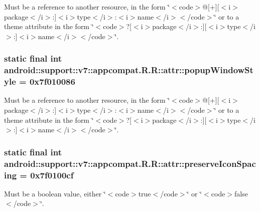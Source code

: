 Must be a reference to another resource, in the form \char`\"{}$<$code$>$@\mbox{[}+\mbox{]}\mbox{[}$<$i$>$package$<$/i$>$:\mbox{]}$<$i$>$type$<$/i$>$:$<$i$>$name$<$/i$>$$<$/code$>$\char`\"{} or to a theme attribute in the form \char`\"{}$<$code$>$?\mbox{[}$<$i$>$package$<$/i$>$:\mbox{]}\mbox{[}$<$i$>$type$<$/i$>$:\mbox{]}$<$i$>$name$<$/i$>$$<$/code$>$\char`\"{}. \hypertarget{classandroid_1_1support_1_1v7_1_1appcompat_1_1_r_1_1attr_9dcd0689639368e5d7b5f2c5ddb26921}{
\subsubsection[{popupWindowStyle}]{\setlength{\rightskip}{0pt plus 5cm}static final int android::support::v7::appcompat.R.R::attr::popupWindowStyle = 0x7f010086}}
\label{classandroid_1_1support_1_1v7_1_1appcompat_1_1_r_1_1attr_9dcd0689639368e5d7b5f2c5ddb26921}


Must be a reference to another resource, in the form \char`\"{}$<$code$>$@\mbox{[}+\mbox{]}\mbox{[}$<$i$>$package$<$/i$>$:\mbox{]}$<$i$>$type$<$/i$>$:$<$i$>$name$<$/i$>$$<$/code$>$\char`\"{} or to a theme attribute in the form \char`\"{}$<$code$>$?\mbox{[}$<$i$>$package$<$/i$>$:\mbox{]}\mbox{[}$<$i$>$type$<$/i$>$:\mbox{]}$<$i$>$name$<$/i$>$$<$/code$>$\char`\"{}. \hypertarget{classandroid_1_1support_1_1v7_1_1appcompat_1_1_r_1_1attr_05c6b925634e11d4ba272d73a5dedb05}{
\subsubsection[{preserveIconSpacing}]{\setlength{\rightskip}{0pt plus 5cm}static final int android::support::v7::appcompat.R.R::attr::preserveIconSpacing = 0x7f0100cf}}
\label{classandroid_1_1support_1_1v7_1_1appcompat_1_1_r_1_1attr_05c6b925634e11d4ba272d73a5dedb05}


Must be a boolean value, either \char`\"{}$<$code$>$true$<$/code$>$\char`\"{} or \char`\"{}$<$code$>$false$<$/code$>$\char`\"{}. 

